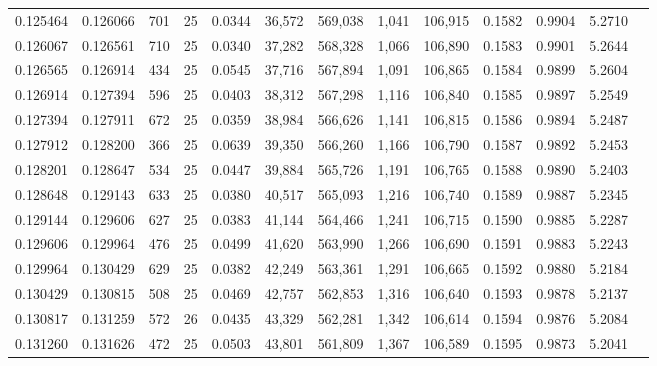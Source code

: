 \begin{tabular}{rrrrrrrrrrrrr}
0.125464 & 0.126066 &   701 &  25 &                                     0.0344 &  36,572 & 569,038 &   1,041 & 106,915 & 0.1582 & 0.9904 & 5.2710 \\
0.126067 & 0.126561 &   710 &  25 &                                     0.0340 &  37,282 & 568,328 &   1,066 & 106,890 & 0.1583 & 0.9901 & 5.2644 \\
0.126565 & 0.126914 &   434 &  25 &                                     0.0545 &  37,716 & 567,894 &   1,091 & 106,865 & 0.1584 & 0.9899 & 5.2604 \\
0.126914 & 0.127394 &   596 &  25 &                                     0.0403 &  38,312 & 567,298 &   1,116 & 106,840 & 0.1585 & 0.9897 & 5.2549 \\
0.127394 & 0.127911 &   672 &  25 &                                     0.0359 &  38,984 & 566,626 &   1,141 & 106,815 & 0.1586 & 0.9894 & 5.2487 \\
0.127912 & 0.128200 &   366 &  25 &                                     0.0639 &  39,350 & 566,260 &   1,166 & 106,790 & 0.1587 & 0.9892 & 5.2453 \\
0.128201 & 0.128647 &   534 &  25 &                                     0.0447 &  39,884 & 565,726 &   1,191 & 106,765 & 0.1588 & 0.9890 & 5.2403 \\
0.128648 & 0.129143 &   633 &  25 &                                     0.0380 &  40,517 & 565,093 &   1,216 & 106,740 & 0.1589 & 0.9887 & 5.2345 \\
0.129144 & 0.129606 &   627 &  25 &                                     0.0383 &  41,144 & 564,466 &   1,241 & 106,715 & 0.1590 & 0.9885 & 5.2287 \\
0.129606 & 0.129964 &   476 &  25 &                                     0.0499 &  41,620 & 563,990 &   1,266 & 106,690 & 0.1591 & 0.9883 & 5.2243 \\
0.129964 & 0.130429 &   629 &  25 &                                     0.0382 &  42,249 & 563,361 &   1,291 & 106,665 & 0.1592 & 0.9880 & 5.2184 \\
0.130429 & 0.130815 &   508 &  25 &                                     0.0469 &  42,757 & 562,853 &   1,316 & 106,640 & 0.1593 & 0.9878 & 5.2137 \\
0.130817 & 0.131259 &   572 &  26 &                                     0.0435 &  43,329 & 562,281 &   1,342 & 106,614 & 0.1594 & 0.9876 & 5.2084 \\
0.131260 & 0.131626 &   472 &  25 &                                     0.0503 &  43,801 & 561,809 &   1,367 & 106,589 & 0.1595 & 0.9873 & 5.2041 \\

\end{tabular}
